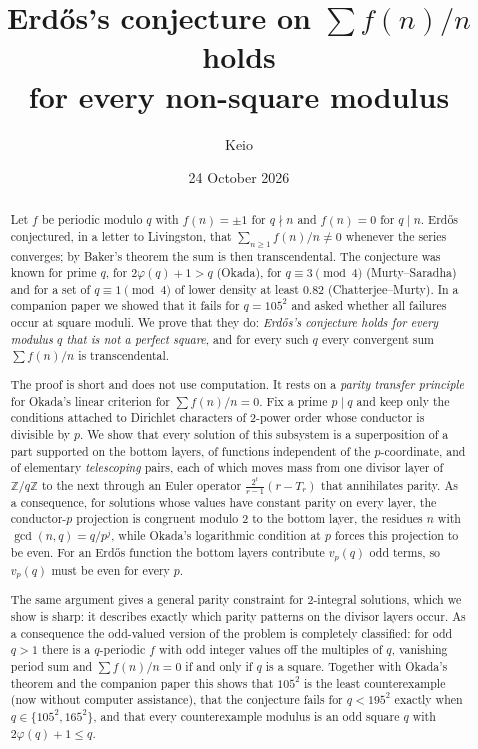\documentclass[11pt]{amsart}
\theoremstyle{definition}
\theoremstyle{remark}
\providecommand{\Z}{\mathbb Z}
\numberwithin{equation}{section}
\begin{document}
\title[Erd\H{o}s's conjecture holds for every non-square modulus]{Erd\H{o}s's conjecture on $\sum f(n)/n$ holds\\ for every non-square modulus}
\author{Keio}
\date{24 October 2026}

\begin{abstract}
Let $f$ be periodic modulo $q$ with $f(n)=\pm1$ for $q\nmid n$ and $f(n)=0$ for $q\mid n$.
Erd\H{o}s conjectured, in a letter to Livingston, that $\sum_{n\ge1}f(n)/n\neq0$ whenever the series converges; by Baker's theorem the sum is then transcendental.
The conjecture was known for prime $q$, for $2\varphi(q)+1>q$ (Okada), for $q\equiv3\pmod4$ (Murty--Saradha) and for a set of $q\equiv1\pmod 4$ of lower density at least $0.82$ (Chatterjee--Murty).
In a companion paper we showed that it fails for $q=105^2$ and asked whether all failures occur at square moduli.
We prove that they do: \emph{Erd\H{o}s's conjecture holds for every modulus $q$ that is not a perfect square}, and for every such $q$ every convergent sum $\sum f(n)/n$ is transcendental.

The proof is short and does not use computation.
It rests on a \emph{parity transfer principle} for Okada's linear criterion for $\sum f(n)/n=0$.
Fix a prime $p\mid q$ and keep only the conditions attached to Dirichlet characters of $2$-power order whose conductor is divisible by $p$.
We show that every solution of this subsystem is a superposition of a part supported on the bottom layers, of functions independent of the $p$-coordinate, and of elementary \emph{telescoping} pairs, each of which moves mass from one divisor layer of $\Z/q\Z$ to the next through an Euler operator $\frac{2^{t}}{r-1}(r-T_r)$ that annihilates parity.
As a consequence, for solutions whose values have constant parity on every layer, the conductor-$p$ projection is congruent modulo $2$ to the bottom layer, the residues $n$ with $\gcd(n,q)=q/p^j$, while Okada's logarithmic condition at $p$ forces this projection to be even.
For an Erd\H{o}s function the bottom layers contribute $v_p(q)$ odd terms, so $v_p(q)$ must be even for every $p$.

The same argument gives a general parity constraint for $2$-integral solutions, which we show is sharp: it describes exactly which parity patterns on the divisor layers occur. As a consequence the odd-valued version of the problem is completely classified: for odd $q>1$ there is a $q$-periodic $f$ with odd integer values off the multiples of $q$, vanishing period sum and $\sum f(n)/n=0$ if and only if $q$ is a square.
Together with Okada's theorem and the companion paper this shows that $105^2$ is the least counterexample (now without computer assistance), that the conjecture fails for $q<195^2$ exactly when $q\in\{105^2,165^2\}$, and that every counterexample modulus is an odd square $q$ with $2\varphi(q)+1\le q$.
\end{abstract}
\maketitle
\tableofcontents
\end{document}
